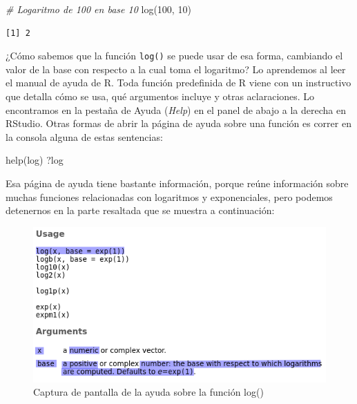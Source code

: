 \documentclass[
]{book}
\newenvironment{Shaded}{\begin{snugshade}}{\end{snugshade}}
\newcommand{\CommentTok}[1]{\textcolor[rgb]{0.56,0.35,0.01}{\textit{#1}}}
\newcommand{\DecValTok}[1]{\textcolor[rgb]{0.00,0.00,0.81}{#1}}
\newcommand{\FunctionTok}[1]{\textcolor[rgb]{0.00,0.00,0.00}{#1}}
\newcommand{\NormalTok}[1]{#1}
\begin{document}
\begin{Shaded}
\begin{Highlighting}[]
\CommentTok{\# Logaritmo de 100 en base 10}
\FunctionTok{log}\NormalTok{(}\DecValTok{100}\NormalTok{, }\DecValTok{10}\NormalTok{)}
\end{Highlighting}
\end{Shaded}

\begin{verbatim}
[1] 2
\end{verbatim}

¿Cómo sabemos que la función \texttt{log()} se puede usar de esa forma, cambiando el valor de la base con respecto a la cual toma el logaritmo? Lo aprendemos al leer el manual de ayuda de R. Toda función predefinida de R viene con un instructivo que detalla cómo se usa, qué argumentos incluye y otras aclaraciones. Lo encontramos en la pestaña de Ayuda (\emph{Help}) en el panel de abajo a la derecha en RStudio. Otras formas de abrir la página de ayuda sobre una función es correr en la consola alguna de estas sentencias:

\begin{Shaded}
\begin{Highlighting}[]
\FunctionTok{help}\NormalTok{(log)}
\NormalTok{?log}
\end{Highlighting}
\end{Shaded}

Esa página de ayuda tiene bastante información, porque reúne información sobre muchas funciones relacionadas con logaritmos y exponenciales, pero podemos detenernos en la parte resaltada que se muestra a continuación:

\begin{figure}

{\centering \includegraphics[width=0.7\linewidth]{images/03_funciones/ayuda} 

}

\caption{Captura de pantalla de la ayuda sobre la función log()}\label{fig:unnamed-chunk-64}
\end{figure}
\end{document}
